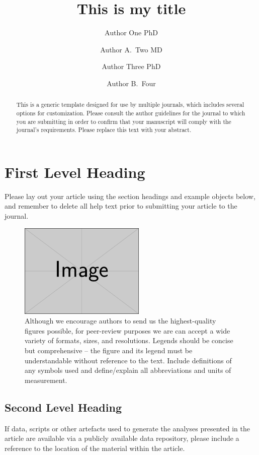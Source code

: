 \documentclass[num-refs]{wiley-article}
\title{This is my title}
\author[1\authfn{1}]{Author One PhD}
\author[2\authfn{1}]{Author A.~Two MD}
\author[2\authfn{2}]{Author Three PhD}
\author[2]{Author B.~Four}
\affil[1]{Department, Institution, City, State or Province, Postal Code, Country}
\affil[2]{Department, Institution, City, State or Province, Postal Code, Country}
\begin{document}
\maketitle

\begin{abstract}
This is a generic template designed for use by multiple journals, which includes several options for customization. 
Please consult the author guidelines for the journal to which you are submitting in order to confirm that your manuscript will comply with the journal's requirements. 
Please replace this text with your abstract.

\end{abstract}

\section{First Level Heading}
Please lay out your article using the section headings and example objects below, and remember to delete all help text prior to submitting your article to the journal.

\begin{figure}[bt]
\centering
\includegraphics[width=6cm]{example-image-rectangle}
\caption{
    Although we encourage authors to send us the highest-quality figures possible, for peer-review purposes we are can accept a wide variety of formats, sizes, and resolutions. 
    Legends should be concise but comprehensive – the figure and its legend must be understandable without reference to the text. 
    Include definitions of any symbols used and define/explain all abbreviations and units of measurement.
}
\end{figure}

\subsection{Second Level Heading}
If data, scripts or other artefacts used to generate the analyses presented in the article are available via a publicly available data repository, please include a reference to the location of the material within the article.
\end{document}
